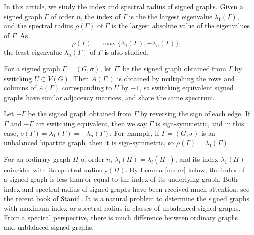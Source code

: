 \documentclass[10pt,a4paper]{amsart}
\numberwithin{equation}{section}
\begin{document}
In this article, we study the index and spectral radius of signed graphs. Given a signed graph $\Gamma$ of order $n$, the index of $\Gamma$ is the the largest eigenvalue $\lambda_1(\Gamma)$,  and the spectral radius $\rho(\Gamma)$ of $\Gamma$ is the largest absolute value of the eigenvalues of $\Gamma$. As \[
\rho(\Gamma)=\max\{\lambda_1(\Gamma), -\lambda_n(\Gamma)\}, 
\] 
the least eigenvalue  $\lambda_n(\Gamma)$  of $\Gamma$ is also studied. 




For a signed graph $\Gamma=(G,\sigma)$, let $\Gamma'$ be the signed graph obtained from $\Gamma$ by switching  $U\subset V(G)$. Then $A(\Gamma')$ is obtained  by multipliing the rows and columns 
of $A(\Gamma)$ corresponding to $U$ by $-1$, so  switching equivalent signed graphs have similar adjacency matrices, and share the same spectrum.



Let $-\Gamma$ be the signed graph obtained from $\Gamma$ by reversing the sign of each edge.
If $\Gamma$ and $-\Gamma$ are switching equivalent, then we say $\Gamma$ is sign-symmetric, and in this case,
$\rho(\Gamma)=\lambda_1(\Gamma)=-\lambda_n(\Gamma)$.  For example, 
if $\Gamma=(G,\sigma)$ is an unbalanced bipartite graph, then it is sign-symmetric, so $\rho(\Gamma)=\lambda_1(\Gamma)$. 

For an ordinary graph $H$ of order $n$, $\lambda_i(H)=\lambda_i(H^+)$, and  its index $\lambda_1(H)$ coincides with its spectral radius $\rho(H)$. 
By 
Lemma \ref{under} below, the index of a signed graph is less than or equal to the index of its underlying graph. 
Both index and spectral radius of signed graphs have been received much attention, see the recent book of Stani\'c \cite{StanB}.  
It is a natural  problem  to determine the signed graphs with maximum index or spectral radius in  classes of unbalanced signed graphs.  From a spectral perspective, there is much difference between ordinary graphs and unblalaced signed graphs. 




 

 


\end{document}
